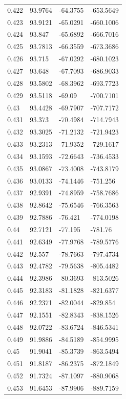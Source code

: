 \begin{tabular}{llll}
0.422 & 93.9764 & -64.3755 & -653.5649 \\
0.423 & 93.9121 & -65.0291 & -660.1006 \\
0.424 & 93.847 & -65.6892 & -666.7016 \\
0.425 & 93.7813 & -66.3559 & -673.3686 \\
0.426 & 93.715 & -67.0292 & -680.1023 \\
0.427 & 93.648 & -67.7093 & -686.9033 \\
0.428 & 93.5802 & -68.3962 & -693.7723 \\
0.429 & 93.5118 & -69.09 & -700.7101 \\
0.43 & 93.4428 & -69.7907 & -707.7172 \\
0.431 & 93.373 & -70.4984 & -714.7943 \\
0.432 & 93.3025 & -71.2132 & -721.9423 \\
0.433 & 93.2313 & -71.9352 & -729.1617 \\
0.434 & 93.1593 & -72.6643 & -736.4533 \\
0.435 & 93.0867 & -73.4008 & -743.8179 \\
0.436 & 93.0133 & -74.1446 & -751.256 \\
0.437 & 92.9391 & -74.8959 & -758.7686 \\
0.438 & 92.8642 & -75.6546 & -766.3563 \\
0.439 & 92.7886 & -76.421 & -774.0198 \\
0.44 & 92.7121 & -77.195 & -781.76 \\
0.441 & 92.6349 & -77.9768 & -789.5776 \\
0.442 & 92.557 & -78.7663 & -797.4734 \\
0.443 & 92.4782 & -79.5638 & -805.4482 \\
0.444 & 92.3986 & -80.3693 & -813.5026 \\
0.445 & 92.3183 & -81.1828 & -821.6377 \\
0.446 & 92.2371 & -82.0044 & -829.854 \\
0.447 & 92.1551 & -82.8343 & -838.1526 \\
0.448 & 92.0722 & -83.6724 & -846.5341 \\
0.449 & 91.9886 & -84.5189 & -854.9995 \\
0.45 & 91.9041 & -85.3739 & -863.5494 \\
0.451 & 91.8187 & -86.2375 & -872.1849 \\
0.452 & 91.7324 & -87.1097 & -880.9068 \\
0.453 & 91.6453 & -87.9906 & -889.7159 \\

\end{tabular}
